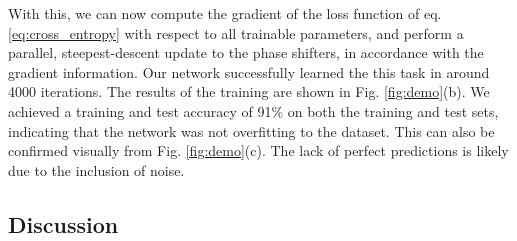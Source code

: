 With this, we can now compute the gradient of the loss function of eq. \ref{eq:cross_entropy} with respect to all trainable parameters, and perform a parallel, steepest-descent update to the phase shifters, in accordance with the gradient information. Our network successfully learned the this task in around 4000 iterations. The results of the training are shown in Fig. \ref{fig:demo}(b). We achieved a training and test accuracy of 91\% on both the training and test sets, indicating that the network was not overfitting to the dataset.  This can also be confirmed visually from Fig. \ref{fig:demo}(c).  The lack of perfect predictions is likely due to the inclusion of noise.



 
\subsection{Discussion}

